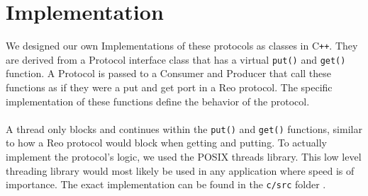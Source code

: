 \section{Implementation}

We designed our own Implementations of these protocols as classes in C\texttt{++}.
They are derived from a Protocol interface class that has a virtual \verb|put()| and \verb|get()| function. A Protocol is passed to a Consumer and Producer that call these functions as if they were a put and get port in a Reo protocol. The specific implementation of these functions define the behavior of the protocol.\\\\
%
A thread only blocks and continues within the \verb|put()| and \verb|get()| functions, similar to how a Reo protocol would block when getting and putting.
To actually implement the protocol's logic, we used the POSIX threads library\cite{pthreads}. This low level threading library would most likely be used in any application where speed is of importance. The exact implementation can be found in the \verb|c/src| folder \cite{us:git}.
